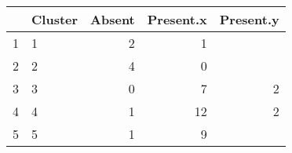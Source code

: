 \begin{table}[ht]
\centering
\begin{tabular}{llrrr}
  \hline
 & Cluster & Absent & Present.x & Present.y \\ 
  \hline
1 & 1 & 2 & 1 &  \\ 
  2 & 2 & 4 & 0 &  \\ 
  3 & 3 & 0 & 7 & 2 \\ 
  4 & 4 & 1 & 12 & 2 \\ 
  5 & 5 & 1 & 9 &  \\ 
   \hline
\end{tabular}
\end{table}
